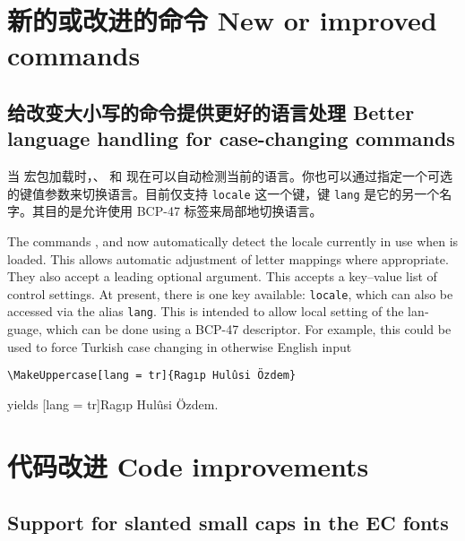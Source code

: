 \documentclass{ltnews}
\begin{document}
\section{新的或改进的命令 New or improved commands}

\subsection{给改变大小写的命令提供更好的语言处理 Better language handling for case-changing commands}

当  宏包加载时，、 和  现在可以自动检测当前的语言。你也可以通过指定一个可选的键值参数来切换语言。目前仅支持 \texttt{locale} 这一个键，键 \texttt{lang} 是它的另一个名字。其目的是允许使用 BCP-47 标签来局部地切换语言。

\begin{english}
The commands ,  and  now
automatically detect the locale currently in use when  is loaded.
This allows automatic adjustment of letter mappings where appropriate. They
also accept a leading optional argument. This accepts a key--value list of
control settings. At present, there is one key available: \texttt{locale},
which can also be accessed via the alias \texttt{lang}. This is intended to
allow local setting of the language, which can be done using a BCP-47
descriptor. For example, this could be used to force Turkish case changing in
otherwise English input
\begin{verbatim}
\MakeUppercase[lang = tr]{Ragıp Hulûsi Özdem}
\end{verbatim}
yields
  \MakeUppercase[lang = tr]{Ragıp Hulûsi Özdem}.
\end{english}


\section{代码改进 Code improvements}

\subsection{Support for slanted small caps in the EC fonts}
\end{document}
